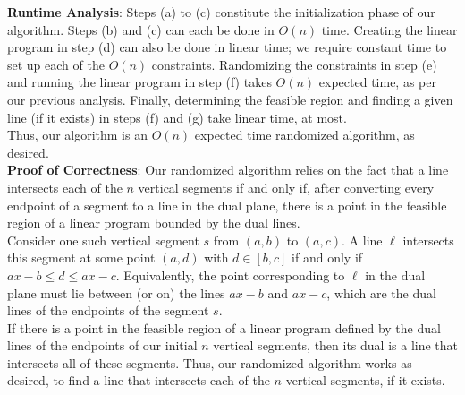 \documentclass[11pt]{article}
\begin{document}
\begin{enumerate}
\textbf{Runtime Analysis}: Steps (a) to (c) constitute the initialization phase of our algorithm. Steps (b) and (c) can each be done in $O(n)$ time. Creating the linear program in step (d) can also be done in linear time; we require constant time to set up each of the $O(n)$ constraints. Randomizing the constraints in step (e) and running the linear program in step (f) takes $O(n)$ expected time, as per our previous analysis. Finally, determining the feasible region and finding a given line (if it exists) in steps (f) and (g) take linear time, at most. \\

Thus, our algorithm is an $O(n)$ expected time randomized algorithm, as desired. \\

\textbf{Proof of Correctness}: Our randomized algorithm relies on the fact that a line intersects each of the $n$ vertical segments if and only if, after converting every endpoint of a segment to a line in the dual plane, there is a point in the feasible region of a linear program bounded by the dual lines. \\

Consider one such vertical segment $s$ from $(a, b)$ to $(a, c)$. A line $\ell$ intersects this segment at some point $(a, d)$ with $d \in [b, c]$ if and only if $ax - b \leq d \leq ax-c$. Equivalently, the point corresponding to $\ell$ in the dual plane must lie between (or on) the lines $ax-b$ and $ax-c$, which are the dual lines of the endpoints of the segment $s$. \\

If there is a point in the feasible region of a linear program defined by the dual lines of the endpoints of our initial $n$ vertical segments, then its dual is a line that intersects all of these segments. Thus, our randomized algorithm works as desired, to find a line that intersects each of the $n$ vertical segments, if it exists.

\end{enumerate}
\end{document}
